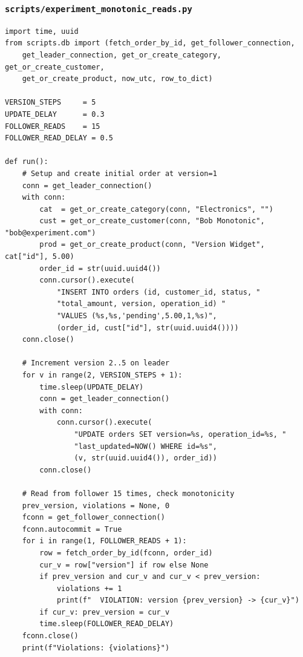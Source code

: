 \documentclass[12pt,a4paper]{article}
\begin{document}
\subsubsection{\texttt{scripts/experiment\_monotonic\_reads.py}}
\begin{lstlisting}[style=pythonstyle]
import time, uuid
from scripts.db import (fetch_order_by_id, get_follower_connection,
    get_leader_connection, get_or_create_category, get_or_create_customer,
    get_or_create_product, now_utc, row_to_dict)

VERSION_STEPS     = 5
UPDATE_DELAY      = 0.3
FOLLOWER_READS    = 15
FOLLOWER_READ_DELAY = 0.5

def run():
    # Setup and create initial order at version=1
    conn = get_leader_connection()
    with conn:
        cat  = get_or_create_category(conn, "Electronics", "")
        cust = get_or_create_customer(conn, "Bob Monotonic", "bob@experiment.com")
        prod = get_or_create_product(conn, "Version Widget", cat["id"], 5.00)
        order_id = str(uuid.uuid4())
        conn.cursor().execute(
            "INSERT INTO orders (id, customer_id, status, "
            "total_amount, version, operation_id) "
            "VALUES (%s,%s,'pending',5.00,1,%s)",
            (order_id, cust["id"], str(uuid.uuid4())))
    conn.close()

    # Increment version 2..5 on leader
    for v in range(2, VERSION_STEPS + 1):
        time.sleep(UPDATE_DELAY)
        conn = get_leader_connection()
        with conn:
            conn.cursor().execute(
                "UPDATE orders SET version=%s, operation_id=%s, "
                "last_updated=NOW() WHERE id=%s",
                (v, str(uuid.uuid4()), order_id))
        conn.close()

    # Read from follower 15 times, check monotonicity
    prev_version, violations = None, 0
    fconn = get_follower_connection()
    fconn.autocommit = True
    for i in range(1, FOLLOWER_READS + 1):
        row = fetch_order_by_id(fconn, order_id)
        cur_v = row["version"] if row else None
        if prev_version and cur_v and cur_v < prev_version:
            violations += 1
            print(f"  VIOLATION: version {prev_version} -> {cur_v}")
        if cur_v: prev_version = cur_v
        time.sleep(FOLLOWER_READ_DELAY)
    fconn.close()
    print(f"Violations: {violations}")
\end{lstlisting}
\end{document}
